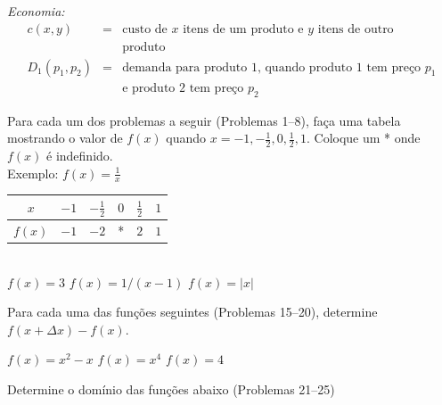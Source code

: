 \emph{Economia:}
\begin{eqnarray*}
 c(x,y) & = & \text{custo de $x$ itens de um produto e $y$ itens de outro} \\
        &   & \text{produto} \\
 D_1(p_1,p_2) & = & \text{demanda para produto 1, quando produto 1 tem preço $p_1$}\\
              &   & \text{e produto 2 tem preço $p_2$}
\end{eqnarray*}

\begin{sectionproblems}

Para cada um dos problemas a seguir (Problemas 1--8), faça uma tabela
mostrando o valor de $f(x)$ quando $x = -1, -\frac{1}{2}, 0, \frac{1}{2}, 1$.
Coloque um * onde $f(x)$ é indefinido.\\

Exemplo:
$\displaystyle f(x) = \frac{1}{x}$%
\SPC\SPC\SPC%
\begin{tabular}{c @{\SPC} | @{\SPC} c @{\SPC} c @{\SPC} c @{\SPC} c @{\SPC} c}
   $x$ & $-1$ & $-\frac{1}{2}$ & $0$ & $\frac{1}{2}$ & $1$ \\
\hline
$f(x)$ & $-1$ &     $-2$       &  *  &      $2$      & $1$
\end{tabular}\\

%
        {$f(x) = 3$}
%
        {$f(x) = 1/(x-1)$}
%
        {$f(x) = |x|$}

Para cada uma das funções seguintes (Problemas 15--20), determine
$f(x + \Delta x) - f(x)$.

%
        {$f(x) = x^2 - x$}
%
        {$f(x) = x^4$}
%
        {$f(x) = 4$}

Determine o domínio das funções abaixo (Problemas 21--25)


\end{sectionproblems}
